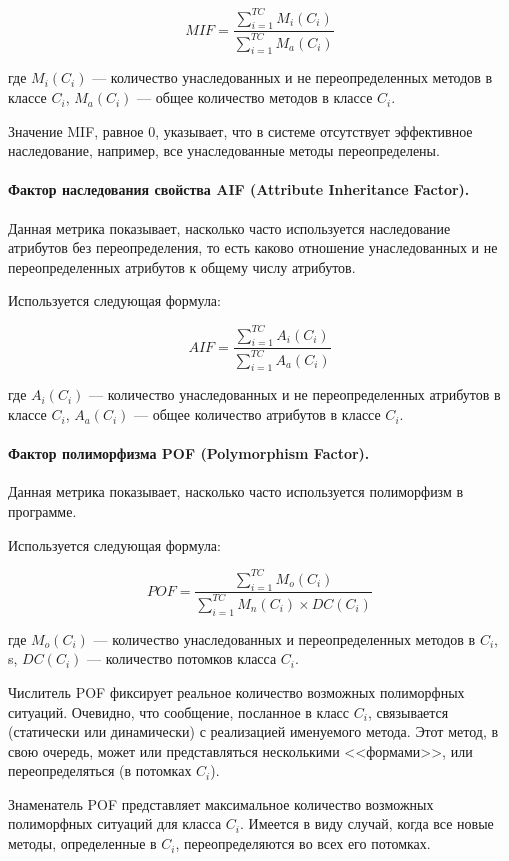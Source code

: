 \documentclass{../../text-style}
\begin{document}
$$MIF = \frac{\sum\limits_{i=1}^{TC}M_i(C_i)}{\sum\limits_{i=1}^{TC}M_a(C_i)}$$

где $M_i(C_i)$ --- количество унаследованных и не переопределенных методов в классе $C_i$, $M_a(C_i)$ --- общее количество методов в классе $C_i$.

Значение MIF, равное 0, указывает, что в системе отсутствует эффективное наследование, например, все унаследованные методы переопределены.

\paragraph{Фактор наследования свойства AIF (Attribute Inheritance Factor).} Данная метрика показывает, насколько часто используется наследование атрибутов без переопределения, то есть каково отношение унаследованных и не переопределенных атрибутов к общему числу атрибутов.

Используется следующая формула:

$$AIF = \frac{\sum\limits_{i=1}^{TC}A_i(C_i)}{\sum\limits_{i=1}^{TC}A_a(C_i)}$$

где $A_i(C_i)$ --- количество унаследованных и не переопределенных атрибутов в классе $C_i$, $A_a(C_i)$ --- общее количество атрибутов в классе $C_i$.

\paragraph{Фактор полиморфизма POF (Polymorphism Factor).} 
Данная метрика показывает, насколько часто используется полиморфизм в программе.

Используется следующая формула:

$$POF = \frac{\sum\limits_{i=1}^{TC}M_o(C_i)}{\sum\limits_{i=1}^{TC}M_n(C_i) \times DC(C_i)}$$

где $M_o(C_i)$ --- количество унаследованных и переопределенных методов в $C_i$, s, $DC(C_i)$ --- количество потомков класса $C_i$.

Числитель POF фиксирует реальное количество возможных полиморфных ситуаций. Очевидно, что сообщение, посланное в класс $C_i$, связывается (статически или динамически) с реализацией именуемого метода. Этот метод, в свою очередь, может или представляться несколькими <<формами>>, или переопределяться (в потомках $C_i$).

Знаменатель POF представляет максимальное количество возможных полиморфных ситуаций для класса $C_i$. Имеется в виду случай, когда все новые методы, определенные в $C_i$, переопределяются во всех его потомках.
\end{document}
